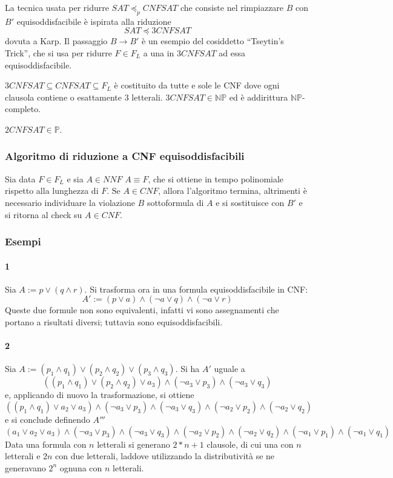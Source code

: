 La tecnica usata per ridurre $SAT \preceq_p CNFSAT$ che consiste nel rimpiazzare 
$B$ con $B'$ equisoddisfacibile è ispirata alla riduzione 
$$
SAT \preceq 3CNFSAT
$$
dovuta a Karp. Il passaggio $B \rightarrow B'$ è un esempio del cosiddetto 
``Tseytin's Trick'', che si usa per ridurre $F \in F_L$ a una 
in $3CNFSAT$ ad essa equisoddisfacibile. 

\begin{defi}
        $3CNFSAT \subseteq CNFSAT \subseteq F_L$ è costituito da tutte 
        e sole le CNF dove ogni clausola contiene o esattamente $3$ 
        letterali. $3CNFSAT \in \mathbb{NP}$ ed è addirittura $\mathbb{NP}$-completo.
\end{defi}
\begin{oss}
        $2CNFSAT \in \mathbb{P}$.
\end{oss}
\subsubsection{Algoritmo di riduzione a CNF equisoddisfacibili}
Sia data $F \in F_L$ e sia $A \in NNF$ $A \equiv F$, che si 
ottiene in tempo polinomiale rispetto alla lunghezza di $F$. 
Se $A \in CNF$, allora l'algoritmo termina, altrimenti è necessario 
individuare la violazione $B$ sottoformula di $A$ e si sostituisce con 
$B'$ e si ritorna al check su $A \in CNF$. 
\subsubsection{Esempi}
\paragraph{1} Sia $A := p \lor (q \land r)$. Si trasforma ora in una 
formula equisoddisfacibile in CNF: 
$$
A' := (p \lor a) \land (\neg a \lor q) \land (\neg a \lor r)
$$
Queste due formule non sono equivalenti, infatti vi sono assegnamenti 
che portano a risultati diversi; tuttavia sono equisoddisfacibili.

\paragraph{2} 
Sia $A := (p_1 \land q_1) \lor (p_2 \land q_2) \lor (p_3 \land q_3)$. Si 
ha $A'$ uguale a 
\[
        ((p_1 \land q_1) \lor (p_2 \land q_2) \lor a_3) \land (\neg a_3 \lor p_3) \land (\neg a_3 \lor q_3)
\]
e, applicando di nuovo la trasformazione, si ottiene 
\[
        ((p_1 \land q_1) \lor a_2 \lor a_3) \land (\neg a_3 \lor p_3) \land (\neg a_3 \lor q_3) \land (\neg a_2 \lor p_2) \land (\neg a_2 \lor q_2) 
\]
e si conclude definendo $A'''$
\[
(a_1 \lor a_2 \lor a_3) \land (\neg a_3 \lor p_3) \land (\neg a_3 \lor q_3) \land (\neg a_2 \lor p_2) \land (\neg a_2 \lor q_2) \land (\neg a_1 \lor p_1) \land (\neg a_1 \lor q_1)
\]
Data una formula con $n$ letterali si generano $2*n +1 $ clausole, 
di cui una con $n$ letterali e $2n$ con due letterali, laddove utilizzando la 
distributività se ne generavano $2^n$ ognuna con $n$ letterali. 


